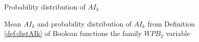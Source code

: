 \documentclass[11pt]{llncs}
\begin{document}
\begin{figure}[ht]
\begin{minipage}[b]{0.5\textwidth}
        \caption{Probability distribution of $AI_k$}
        \label{fig:probFullDist}
    \end{minipage}
    \caption{Mean $AI_k$ and probability distribution of $AI_k$ from Definition \ref{def:distAIk} of Boolean functions the family $WPB_2$ variable}
    \label{fig:dullDist}
\end{figure}

\end{document}

